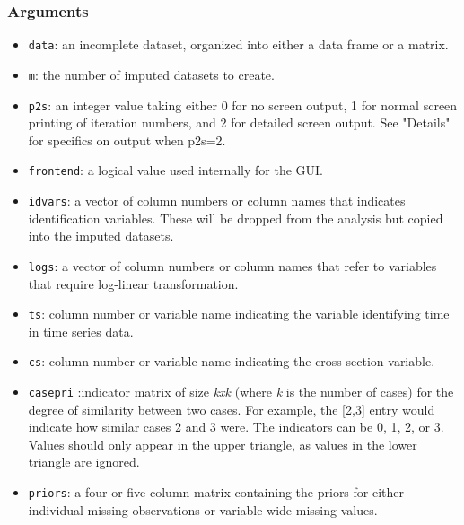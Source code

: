 \documentclass[12pt,titlepage]{article}
\begin{document}
\subsubsection*{Arguments}
    \begin{itemize}
      \item \texttt{data}: an incomplete dataset, organized into either a
        data frame or a matrix.
  
       \item \texttt{m}: the number of imputed datasets to create.
  
       \item \texttt{p2s}: an integer value taking either 0 for no
         screen output, 1 for normal screen printing of iteration
         numbers, and 2 for detailed screen output.  See "Details" for
         specifics on output when p2s=2.

      \item \texttt{frontend}: a logical value used internally for the GUI.
  
      \item \texttt{idvars}: a vector of column numbers or column
        names that indicates identification variables.  These will be dropped from the analysis but copied into the imputed datasets.
    
      \item \texttt{logs}: a vector of column numbers or column names
        that refer to variables that require log-linear
        transformation.
    
      \item \texttt{ts}: column number or variable name indicating the variable identifying time in time series data. 
  
      \item \texttt{cs}: column number or variable name indicating the cross
        section variable.

  
      \item \texttt{casepri} :indicator matrix of size \emph{kxk} (where
        \emph{k} is the number of cases) for the degree of similarity between
        two cases.  For example, the [2,3] entry would indicate how similar
        cases 2 and 3 were.  The indicators can be 0, 1, 2, or 3.  Values should
        only appear in the upper triangle, as values in the lower triangle are
        ignored.
    
      \item \texttt{priors}: a four or five column matrix containing the priors
        for either individual missing observations or variable-wide missing
        values.
    

\end{itemize}
\end{document}
